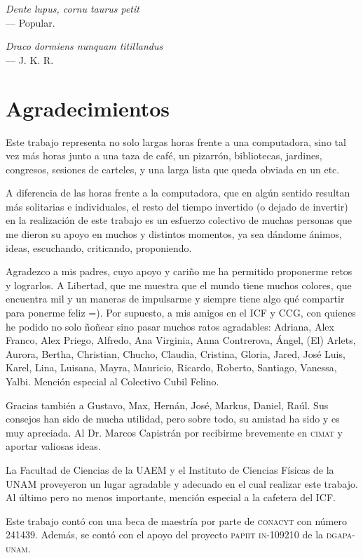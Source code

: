 
\begin{flushright}{\slshape
	Dente lupus, cornu taurus petit}\\
\medskip
    --- Popular.
\end{flushright}

\begin{flushright}{\slshape
	Draco dormiens nunquam titillandus}\\
\medskip
    --- J. K. R.
\end{flushright}


\bigskip

\begingroup
\let\clearpage\relax
\let\cleardoublepage\relax
\let\cleardoublepage\relax
\chapter*{Agradecimientos}
Este trabajo representa no solo largas horas frente a una computadora, sino tal vez más horas junto a una taza de café, un pizarrón, bibliotecas, jardines, congresos, sesiones de carteles, y una larga lista que queda obviada en un etc.

A diferencia de las horas frente a la computadora, que en algún sentido resultan más solitarias e individuales, el resto del tiempo invertido (o dejado de invertir) en la realización de este trabajo es un esfuerzo colectivo de muchas personas que me dieron su apoyo en muchos y distintos momentos, ya sea dándome ánimos, ideas, escuchando, criticando, proponiendo.

Agradezco a mis padres, cuyo apoyo y cariño me ha permitido proponerme retos y lograrlos. A Libertad, que me muestra que el mundo tiene muchos colores, que encuentra mil y un maneras de impulsarme y siempre tiene algo qué compartir para ponerme feliz =). 
Por supuesto, a mis amigos en el ICF y CCG, con quienes he podido no solo ñoñear sino pasar muchos ratos agradables: Adriana, Alex Franco, Alex Priego, Alfredo, Ana Virginia, Anna Contrerova, Ángel, (El) Arlets, Aurora, Bertha, Christian, Chucho, Claudia, Cristina, Gloria, Jared, José Luis, Karel, Lina, Luisana, Mayra, Mauricio, Ricardo, Roberto, Santiago, Vanessa, Yalbi. Mención especial al Colectivo Cubil Felino.

Gracias también a Gustavo, Max, Hernán, José, Markus, Daniel, Raúl. Sus consejos han sido de mucha utilidad, pero sobre todo, su amistad ha sido y es muy apreciada. Al Dr. Marcos Capistrán por recibirme brevemente en \textsc{cimat} y aportar valiosas ideas.

La Facultad de Ciencias de la UAEM y el Instituto de Ciencias Físicas de la UNAM proveyeron un lugar agradable y adecuado en el cual realizar este trabajo. Al último pero no menos importante, mención especial a la cafetera del ICF.

\bigskip

Este trabajo cont\'o con una beca de maestr\'ia por parte de \textsc{conacyt} con n\'umero 241439.
Adem\'as, se cont\'o con el apoyo del proyecto \textsc{papiit in-109210} de la \textsc{dgapa-unam}.
\endgroup



